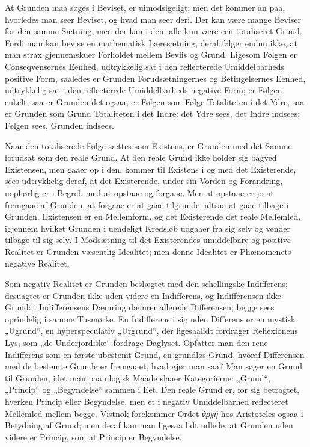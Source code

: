 \documentclass[11pt]{book}
\newcommand{\opage}[1]{\marginnote{\footnotesize\textit{[#1]}}}
\begin{document}
At Grunden maa søges i Beviset, er uimodsigeligt; men det
kommer an paa, hvorledes man seer Beviset, og hvad man
seer deri. Der kan være mange Beviser for den samme
Sætning, men der kan i dem alle kun være een totaliseret
Grund. Fordi man kan bevise en mathematisk Læresætning,
\opage{90} \setcounter{footnote}{0}%
deraf følger endnu ikke, at man strax gjennemskuer Forholdet
mellem Beviis og Grund. Ligesom Følgen er Conseqvensernes
Eenhed, udtrykkelig sat i den reflecterede Umiddelbarheds
positive Form, saaledes er Grunden Forudsætningernes og
Betingelsernes Eenhed, udtrykkelig sat i den reflecterede
Umiddelbarheds negative Form; er Følgen enkelt, saa er
Grunden det ogsaa, er Følgen som Følge Totaliteten i det
Ydre, saa er Grunden som Grund Totaliteten i det Indre: det
Ydre sees, det Indre indsees; Følgen sees, Grunden indsees.

Naar den totaliserede Følge sættes som Existens, er Grunden
med det Samme forudsat som den reale Grund. At den reale
Grund ikke holder sig bagved Existensen, men gaaer op i den,
kommer til Existens i og med det Existerende, sees
udtrykkelig deraf, at det Existerende, under sin Vorden og
Forandring, uophørlig er i Begreb med at opstaae og forgaae.
Men at opstaae er jo at fremgaae af Grunden, at forgaae er
at gaae tilgrunde, altsaa at gaae tilbage i Grunden. Existensen
er en Mellemform, og det Existerende det reale Mellemled,
igjennem hvilket Grunden i uendeligt Kredsløb udgaaer fra sig
selv og vender tilbage til sig selv. I Modsætning til det
Existerendes umiddelbare og positive Realitet er Grunden
væsentlig Idealitet; men denne Idealitet er Phænomenets
negative Realitet.

Som negativ Realitet er Grunden beslægtet med den
schellingske Indifferens; desuagtet er Grunden ikke uden videre
en Indifferens, og Indifferensen ikke Grund: i Indifferensens
Dæmring dæmrer allerede Differensen; begge sees oprindelig i
samme Tusmørke. En Indifferens i sig uden Differens er en
mystisk „Ugrund“, en hyperspeculativ „Urgrund“, der
ligesaalidt fordrager Reflexionens Lys, som „de Underjordiske“
fordrage Daglyset. Opfatter man den rene Indifferens som en
første ubestemt Grund, en grundløs Grund, hvoraf Differensen
med de bestemte Grunde er fremgaaet, hvad gjør man saa?
Man søger en Grund til Grunden, idet man paa
\opage{91} \setcounter{footnote}{0}%
ulogisk Maade slaaer Kategorierne: „Grund“, „Princip“ og
„Begyndelse“ sammen i Eet. Den reale Grund er, for sig
betragtet, hverken Princip eller Begyndelse, men et i negativ
Umiddelbarhed reflecteret Mellemled mellem begge. Vistnok
forekommer Ordet \textit{ἀρχή} hos Aristoteles ogsaa i
Betydning af Grund; men deraf kan man ligesaa lidt udlede,
at Grunden uden videre er Princip, som at Princip er
Begyndelse.
\end{document}
